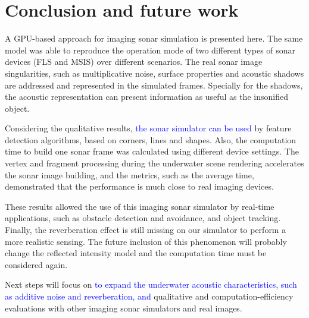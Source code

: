 \documentclass[final,5p,times]{elsarticle}
\begin{document}

\section{Conclusion and future work}
\label{conclusion}

A GPU-based approach for imaging sonar simulation is presented here.
The same model was able to reproduce the operation mode of two different
types of sonar devices (FLS and MSIS) over different scenarios. The real
sonar image singularities, such as multiplicative noise, surface
properties and acoustic shadows are addressed and represented in the
simulated frames. Specially for the shadows, the acoustic representation
can present information as useful as the insonified object. 

Considering
the qualitative results, \textcolor{blue}{the sonar simulator can be used} by feature detection
algorithms, based on corners, lines and shapes. Also, the computation time
to build one sonar frame was calculated using different device settings.
The vertex and fragment processing during the underwater scene rendering
accelerates the sonar image building, and the metrics, such as the average
time, demonstrated that the performance is much close to real imaging
devices. 

These results allowed the use of this imaging sonar simulator
by real-time applications, such as obstacle detection and avoidance, and
object tracking. Finally, the reverberation effect is still missing on
our simulator to perform a more realistic sensing. The future inclusion
of this phenomenon will probably change the reflected intensity model
and the computation time must be considered again. 

Next steps will
focus on \textcolor{blue}{to expand the underwater acoustic characteristics, such as additive
noise and reverberation, and} qualitative and computation\hyp{}efficiency
evaluations with other imaging sonar simulators and real images.








\end{document}
